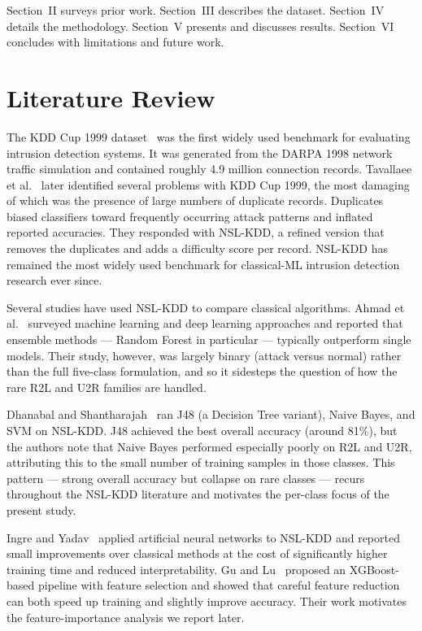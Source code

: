 \documentclass[conference, twocolumn]{IEEEtran}
\begin{document}
Section~II surveys prior work. Section~III describes the dataset. Section~IV details the methodology. Section~V presents and discusses results. Section~VI concludes with limitations and future work.

\section{Literature Review}

The KDD Cup 1999 dataset~\cite{kdd99} was the first widely used benchmark for evaluating intrusion detection systems. It was generated from the DARPA 1998 network traffic simulation and contained roughly 4.9 million connection records. Tavallaee et al.~\cite{tavallaee2009} later identified several problems with KDD Cup 1999, the most damaging of which was the presence of large numbers of duplicate records. Duplicates biased classifiers toward frequently occurring attack patterns and inflated reported accuracies. They responded with NSL-KDD, a refined version that removes the duplicates and adds a difficulty score per record. NSL-KDD has remained the most widely used benchmark for classical-ML intrusion detection research ever since.

Several studies have used NSL-KDD to compare classical algorithms. Ahmad et al.~\cite{ahmad2021} surveyed machine learning and deep learning approaches and reported that ensemble methods --- Random Forest in particular --- typically outperform single models. Their study, however, was largely binary (attack versus normal) rather than the full five-class formulation, and so it sidesteps the question of how the rare R2L and U2R families are handled.

Dhanabal and Shantharajah~\cite{dhanabal2015} ran J48 (a Decision Tree variant), Naive Bayes, and SVM on NSL-KDD. J48 achieved the best overall accuracy (around 81\%), but the authors note that Naive Bayes performed especially poorly on R2L and U2R, attributing this to the small number of training samples in those classes. This pattern --- strong overall accuracy but collapse on rare classes --- recurs throughout the NSL-KDD literature and motivates the per-class focus of the present study.

Ingre and Yadav~\cite{ingre2015} applied artificial neural networks to NSL-KDD and reported small improvements over classical methods at the cost of significantly higher training time and reduced interpretability. Gu and Lu~\cite{gu2021} proposed an XGBoost-based pipeline with feature selection and showed that careful feature reduction can both speed up training and slightly improve accuracy. Their work motivates the feature-importance analysis we report later.
\end{document}
